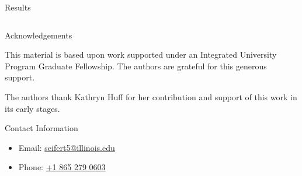 \documentclass[final]{beamer}
\newlength{\onecolwid}
\newlength{\threecolwid}
\begin{document}
\begin{frame}[t]
\begin{columns}[t,totalwidth=\threecolwid]
\begin{column}{\onecolwid}
\begin{block}{Results}
\begin{table}[H]
\begin{tabular}{ | c | c | c | c | }
 \hline
\end{tabular}
\end{table}



\end{block}

%




\begin{block}{Acknowledgements}

	This material is based upon work supported under an Integrated University Program Graduate Fellowship. The authors are grateful for this generous support.

The authors thank Kathryn Huff for her contribution and support of this work in its early stages.
	
\end{block}



\begin{alertblock}{Contact Information}
	\begin{itemize}
		\item Email: \href{mailto:seifert5@illinois.edu}{seifert5@illinois.edu}
		\item Phone: \href{tel:18652790603}{+1 865 279 0603}
	\end{itemize}
	

\end{alertblock}
\end{column}
\end{columns}
\end{frame}
\end{document}
